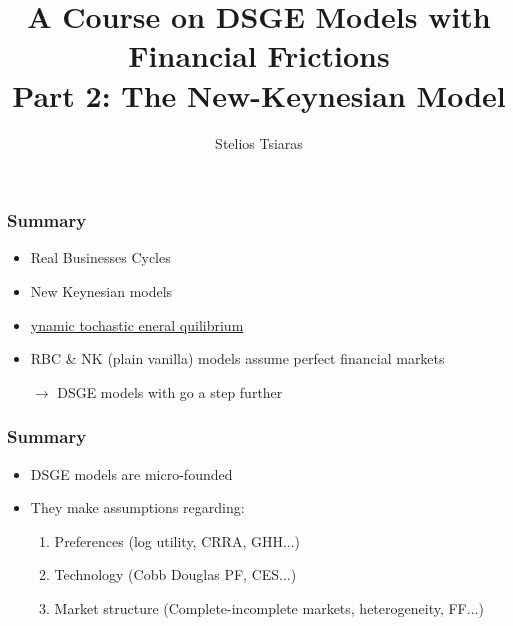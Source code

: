 \documentclass[xcolor=dvipsnames,handout,aspectratio=169]{beamer}
\title[\today]{\textbf{A Course on DSGE Models with Financial Frictions\\ Part 2: The New-Keynesian Model}}
\author{Stelios Tsiaras}
\institute{European University Institute}
\begin{document}
\begin{frame}[noframenumbering]
\titlepage 
\end{frame}

\begin{frame}[c]\frametitle {\textbf{Summary}} 
\begin{itemize}
    \setlength\itemsep{2em}
    \item Real Businesses Cycles 
    \item New Keynesian models 
    \item \underline{{\color{Magenta}{D}}ynamic {\color{Magenta}{S}}tochastic {\color{Magenta}{G}}eneral {\color{Magenta}{E}}quilibrium}
    \item RBC \& NK (plain vanilla) models assume perfect financial markets 

$\rightarrow$ DSGE models with {\color{Magenta}{financial frictions}} go a step further
\end{itemize}
\end{frame}

\begin{frame}[c]\frametitle {\textbf{Summary}} 
\begin{itemize}
    \setlength\itemsep{2em}
\item DSGE models are micro-founded 
\item They make assumptions regarding: 
\begin{enumerate}
    \item Preferences (log utility, CRRA, GHH...)
    \item Technology (Cobb Douglas PF, CES...)
    \item Market structure (Complete-incomplete markets, heterogeneity, FF...)
\end{enumerate}

\end{itemize}
\end{frame}
\end{document}
